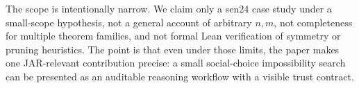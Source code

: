 The scope is intentionally narrow.
We claim only a sen24 case study under a small-scope hypothesis, not a general account of arbitrary $n,m$, not completeness for multiple theorem families, and not formal Lean verification of symmetry or pruning heuristics.
The point is that even under those limits, the paper makes one JAR-relevant contribution precise: a small social-choice impossibility search can be presented as an auditable reasoning workflow with a visible trust contract.
